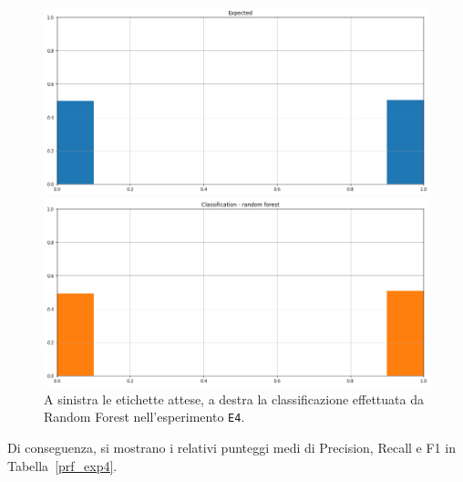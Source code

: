 \documentclass[12pt]{report}
\theoremstyle{definition}
\begin{document}
\begin{figure}
\centering
    \begin{minipage}{0.48\textwidth}
        \includegraphics[width=\linewidth]{images/experiment_uniform_sovrapposti/expected_classification.png}
    \end{minipage}
    \begin{minipage}{0.48\textwidth}
        \includegraphics[width=\linewidth]{images/experiment_uniform_sovrapposti/prediction_classification_rf.png}
    \end{minipage}
    \caption{A sinistra le etichette attese, a destra la classificazione effettuata da Random Forest nell'esperimento \texttt{E4}.}
    \label{rf_class_exp4}
\end{figure} 
Di conseguenza, si mostrano i relativi punteggi medi di Precision, Recall e F1 in Tabella~\ref{prf_exp4}.
\end{document}
